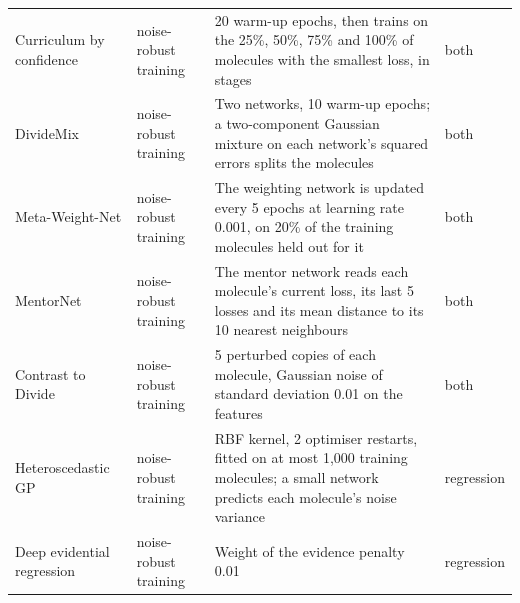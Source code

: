 {\begin{longtable}{@{}p{2.9cm}p{2.0cm}p{7.3cm}p{1.6cm}@{}}
Curriculum by confidence & noise-robust training & 20 warm-up epochs, then trains on the 25\%, 50\%, 75\% and 100\% of molecules with the smallest loss, in stages & both \\
DivideMix & noise-robust training & Two networks, 10 warm-up epochs; a two-component Gaussian mixture on each network's squared errors splits the molecules & both \\
Meta-Weight-Net & noise-robust training & The weighting network is updated every 5 epochs at learning rate 0.001, on 20\% of the training molecules held out for it & both \\
MentorNet & noise-robust training & The mentor network reads each molecule's current loss, its last 5 losses and its mean distance to its 10 nearest neighbours & both \\
Contrast to Divide & noise-robust training & 5 perturbed copies of each molecule, Gaussian noise of standard deviation 0.01 on the features & both \\
\midrule
Heteroscedastic GP & noise-robust training & RBF kernel, 2 optimiser restarts, fitted on at most 1{,}000 training molecules; a small network predicts each molecule's noise variance & regression \\
Deep evidential regression & noise-robust training & Weight of the evidence penalty 0.01 & regression \\
\bottomrule
\end{longtable}
}

